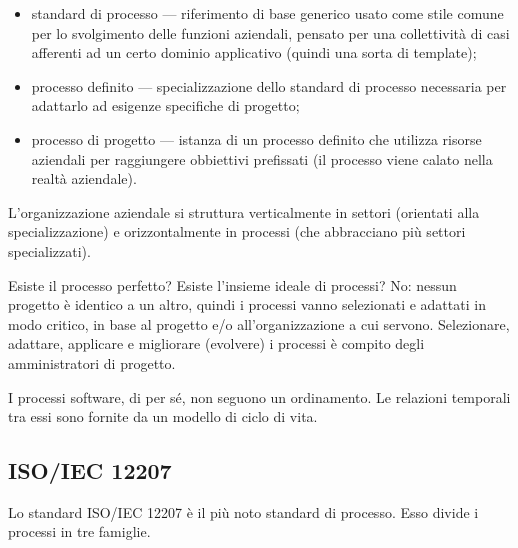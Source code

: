 \documentclass[a4paper]{article}
\begin{document}
	\begin{itemize}
		
			
	\item standard di processo --- riferimento di base generico usato come stile comune per lo svolgimento delle funzioni aziendali, pensato per una collettività di casi afferenti ad un certo dominio applicativo (quindi una sorta di template); %

			
	\item processo definito --- specializzazione dello standard di processo necessaria per adattarlo ad esigenze specifiche di progetto;
			
	\item processo di progetto --- istanza di un processo definito che utilizza risorse aziendali per raggiungere obbiettivi prefissati (il processo viene calato nella realtà aziendale).
		
	\end{itemize}

		
L'organizzazione aziendale si struttura verticalmente in settori (orientati alla specializzazione) e orizzontalmente in processi (che abbracciano più settori specializzati).
		
Esiste il processo perfetto? Esiste l'insieme ideale di processi? No: nessun progetto è identico a un altro, quindi i processi vanno selezionati e adattati in modo critico, in base al progetto e/o all'organizzazione a cui servono. Selezionare, adattare, applicare e migliorare (evolvere) i processi è compito degli amministratori di progetto.
		
I processi software, di per sé, non seguono un ordinamento. Le relazioni temporali tra essi sono fornite da un modello di ciclo di vita.

		
	\subsection{ISO/IEC 12207}

		
Lo standard ISO/IEC 12207 è il più noto standard di processo. Esso divide i processi in tre famiglie.
		
\end{document}
